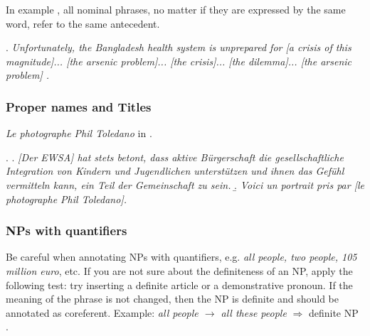 \documentclass[a4paper]{article}
\begin{document}
In example \Next, all nominal phrases, no matter if they are expressed by the
same word, refer to the same antecedent.%

\ex. {\sl Unfortunately, the Bangladesh health system is unprepared for [a crisis of this magnitude]...  [the arsenic problem]... [the crisis]... [the dilemma]... [the arsenic problem] .}

\subsubsection{Proper names and Titles}

\textsl{Le photographe Phil Toledano} in \Next[b].

\ex. 
\a. \label{eswa}{\sl [Der EWSA] hat stets betont, dass aktive Bürgerschaft die gesellschaftliche Integration von Kindern und Jugendlichen unterstützen und ihnen das Gefühl vermitteln kann, ein Teil der Gemeinschaft zu sein.}
\b. 
\textsl{Voici un portrait pris par [le photographe Phil Toledano].}

\subsubsection{NPs with quantifiers}

Be careful when annotating NPs with quantifiers, e.g. {\sl all people, two
people, 105 million euro}, etc. If you are not sure about the definiteness of an
NP, apply the following test: try inserting a definite article or a
demonstrative pronoun. If the meaning of the phrase is not changed, then the NP
is definite and should be annotated as coreferent. Example: {\sl all people
$\rightarrow$ all these people} $\Rightarrow$ definite NP \cite[p.
3]{GrishinaStedeGuide}.
\end{document}
